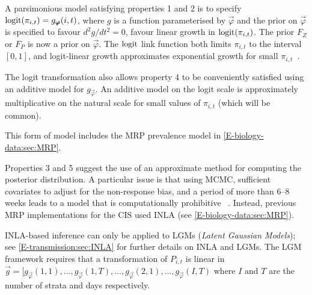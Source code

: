 \documentclass[thesis.tex]{subfiles}
\begin{document}
A parsimonious model satisfying properties 1 and 2 is to specify $\operatorname{logit}(\pi_{i,t}) = g_{\bm{\varphi}}(i, t)$, where $g$ is a function parameterised by ${\vec{\varphi}}$ and the prior on ${\vec{\varphi}}$ is specified to favour $d^2g/dt^2 = 0$, \ie favour linear growth in $\operatorname{logit}(\pi_{i,t})$.
The prior $F_Z$ or $F_P$ is now a prior on ${\vec{\varphi}}$.
The $\operatorname{logit}$ link function both limits $\pi_{i,t}$ to the interval $[0, 1]$, and logit-linear growth approximates exponential growth for small $\pi_{i,t}$~\autocite{ealesAppropriately}.

The logit transformation also allows property 4 to be conveniently satisfied using an additive model for $g_{\vec{\varphi}}$.
An additive model on the logit scale is approximately multiplicative on the natural scale for small values of $\pi_{i,t}$ (which will be common).

This form of model includes the MRP prevalence model in \cref{E-biology-data:sec:MRP}.




Properties 3 and 5 suggest the use of an approximate method for computing the posterior distribution.
A particular issue is that using MCMC, sufficient covariates to adjust for the non-response bias, and a period of more than 6--8 weeks leads to a model that is computationally prohibitive ~.
Instead, previous MRP implementations for the CIS used INLA (see \cref{E-biology-data:sec:MRP}).

INLA-based inference can only be applied to LGMs (\emph{Latent Gaussian Models}); see \cref{E-transmission:sec:INLA} for further details on INLA and LGMs.
The LGM framework requires that a transformation of $P_{i,t}$ is linear in $\vec{g} = [g_{{\vec{\varphi}}}(1, 1), \dots, g_{{\vec{\varphi}}}(1, T), \dots, g_{{\vec{\varphi}}}(2, 1), \dots, g_{{\vec{\varphi}}}(I, T)$ where $I$ and $T$ are the number of strata and days respectively.
\end{document}
